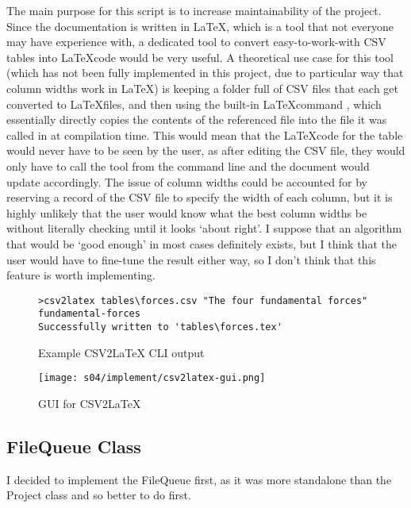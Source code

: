         The main purpose for this script is to increase maintainability of the project. 
        Since the documentation is written in \LaTeX, which is a tool that not everyone may have experience with, a dedicated tool to convert easy-to-work-with CSV tables into \LaTeX code would be very useful. 
        A theoretical use case for this tool (which has not been fully implemented in this project, due to particular way that column widths work in \LaTeX) is keeping a folder full of CSV files that each get converted to \LaTeX files, and then using the built-in \LaTeX command \verb||, which essentially directly copies the contents of the referenced file into the file it was called in at compilation time. 
        This would mean that the \LaTeX code for the table would never have to be seen by the user, as after editing the CSV file, they would only have to call the tool from the command line and the document would update accordingly.
        The issue of column widths could be accounted for by reserving a record of the CSV file to specify the width of each column, but it is highly unlikely that the user would know what the best column widths be without literally checking until it looks `about right'. 
        I suppose that an algorithm that would be `good enough' in most cases definitely exists, but I think that the user would have to fine-tune the result either way, so I don't think that this feature is worth implementing.

        \begin{figure}[!ht]
            \begin{verbatim}
>csv2latex tables\forces.csv "The four fundamental forces" fundamental-forces
Successfully written to 'tables\forces.tex'
            \end{verbatim}
            \caption{Example CSV2LaTeX CLI output}
            \label{pc:csv2latex-cli-output}
        \end{figure}

        \begin{figure}[!ht]
            \centering
            \texttt{[image: s04/implement/csv2latex-gui.png]}
            \caption{GUI for CSV2LaTeX}
            \label{fig:csv2latex-gui}
        \end{figure}
        
    
    \subsection{FileQueue Class}
        I decided to implement the FileQueue first, as it was more standalone than the Project class and so better to do first. 

